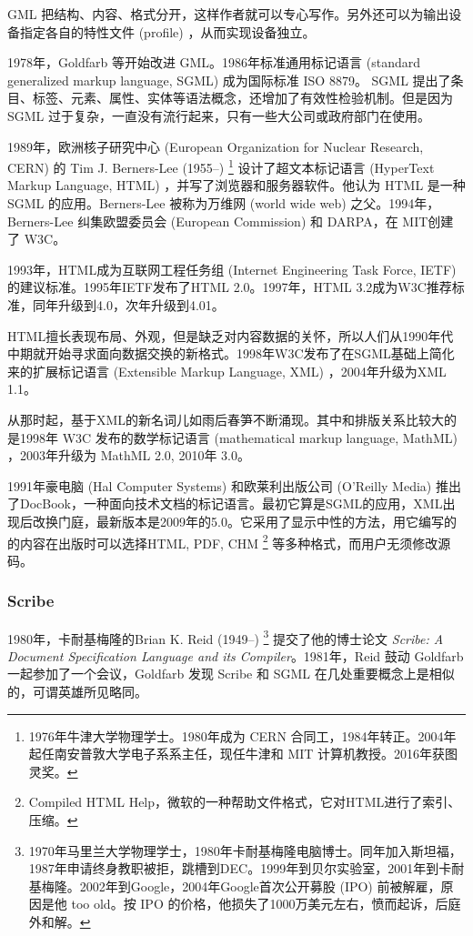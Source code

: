 GML 把结构、内容、格式分开，这样作者就可以专心写作。另外还可以为输出设备指定各自的特性文件 (profile) ，从而实现设备独立。

1978年，Goldfarb 等开始改进 GML。1986年标准通用标记语言 (standard generalized markup language, SGML) 成为国际标准 ISO 8879。 SGML 提出了条目、标签、元素、属性、实体等语法概念，还增加了有效性检验机制。但是因为 SGML 过于复杂，一直没有流行起来，只有一些大公司或政府部门在使用。

1989年，欧洲核子研究中心 (European Organization for Nuclear Research, CERN)\indexCERN{} 的 Tim J. Berners-Lee (1955--)\indexBernersLee{} \footnote{1976年牛津大学物理学士。1980年成为 CERN 合同工，1984年转正。2004年起任南安普敦大学电子系系主任，现任牛津和 MIT 计算机教授。2016年获图灵奖。} 设计了超文本标记语言 (HyperText Markup Language, HTML) ，并写了浏览器和服务器软件。他认为 HTML 是一种 SGML 的应用。Berners-Lee 被称为万维网 (world wide web) 之父。1994年，Berners-Lee 纠集欧盟委员会 (European Commission) \indexEC 和 DARPA\indexDARPA{}，在 MIT\indexMIT 创建了 W3C\indexWWWC。

1993年，HTML成为互联网工程任务组 (Internet Engineering Task Force, IETF)\indexIETF{} 的建议标准。1995年IETF发布了HTML 2.0。1997年，HTML 3.2成为W3C推荐标准，同年升级到4.0，次年升级到4.01。

HTML擅长表现布局、外观，但是缺乏对内容数据的关怀，所以人们从1990年代中期就开始寻求面向数据交换的新格式。1998年W3C发布了在SGML基础上简化来的扩展标记语言 (Extensible Markup Language, XML) ，2004年升级为XML 1.1。

从那时起，基于XML的新名词儿如雨后春笋不断涌现。其中和排版关系比较大的是1998年 W3C 发布的数学标记语言 (mathematical markup language, MathML) ，2003年升级为 MathML 2.0, 2010年 3.0。

1991年豪电脑 (Hal Computer Systems)\indexHal{} 和欧莱利出版公司 (O'Reilly Media)\indexOreilly{} 推出了DocBook，一种面向技术文档的标记语言。最初它算是SGML的应用，XML出现后改换门庭，最新版本是2009年的5.0。它采用了显示中性的方法，用它编写的的内容在出版时可以选择HTML, PDF, CHM \footnote{Compiled HTML Help，微软的一种帮助文件格式，它对HTML进行了索引、压缩。} 等多种格式，而用户无须修改源码。

\subsubsection{Scribe}

1980年，卡耐基梅隆的Brian K. Reid (1949--)\indexReid{} \footnote{1970年马里兰大学物理学士，1980年卡耐基梅隆电脑博士。同年加入斯坦福，1987年申请终身教职被拒，跳槽到DEC。1999年到贝尔实验室\indexBell{}，2001年到卡耐基梅隆。2002年到Google，2004年Google首次公开募股 (IPO) 前被解雇，原因是他 too old。按 IPO 的价格，他损失了1000万美元左右，愤而起诉，后庭外和解。} 提交了他的博士论文 \emph{Scribe: A Document Specification Language and its Compiler}。1981年，Reid 鼓动 Goldfarb 一起参加了一个会议，Goldfarb 发现 Scribe 和 SGML 在几处重要概念上是相似的，可谓英雄所见略同。

